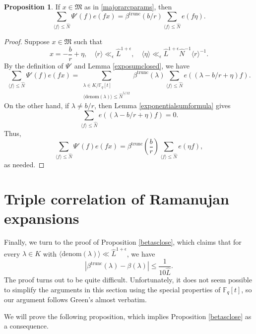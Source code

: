 \documentclass{article}
\theoremstyle{definition}
\newtheorem{prop}{Proposition}[section]
\theoremstyle{definition}
\theoremstyle{remark}
\newcommand{\F}{\mathbb{F}_q[t]}
\newcommand{\1}{\mathbf{1}}
\numberwithin{equation}{section}
\begin{document}
  \setcounter{prop}{2} %
  \begin{prop}\label{prop:5.3}
If $x\in \mathfrak{M}$ as in \eqref{majorarcparams}, then 
\[\sum_{\langle f\rangle \leq \widehat{N}} \Psi'(f)e(fx) =\beta^{\text{trunc}}(b\slash r)\sum_{\langle f\rangle \leq \widehat{N}} e(f\eta).\]
  \end{prop}



\begin{proof}
Suppose $x\in \mathfrak{M}$ such that 
\[x= -\frac{b}{r}+\eta, \quad\langle r \rangle \ll_{\epsilon} \widehat{L}^{1+\epsilon},\quad\langle \eta \rangle \ll_{\epsilon} \widehat{L}^{1+\epsilon}\widehat{N}^{-1}\langle r \rangle^{-1}.\]
By the definition of $\Psi'$ and Lemma \ref{exposumclosed}, we have
\[
\sum_{\langle f\rangle \leq \widehat{N}} \Psi'(f)e(fx)=\sum_{\substack{\lambda\in K\slash \F\\\langle \text{denom}(\lambda)\rangle\leq\widehat{N}^{5\slash 12}}}\beta^{\text{trunc}}(\lambda)\sum_{\langle f \rangle \leq \widehat{N}}e((\lambda-b\slash r+\eta)f).
\]
On the other hand, if $\lambda\neq b/r$, then Lemma \ref{exponentialsumformula} gives 
\[\sum_{\langle f \rangle \leq \widehat{N}}e((\lambda-b\slash r+\eta)f)=0.\]
Thus, 
\[\sum_{\langle f\rangle \leq \widehat{N}} \Psi'(f)e(fx)=\beta^{\text{trunc}}\left(\frac{b}{r}\right)\sum_{\langle f \rangle \leq \widehat{N}}e(\eta f),\]
as needed. 
\end{proof}
\endgroup

\setcounter{prop}{\value{saveprop}}

\section{Triple correlation of Ramanujan expansions}
Finally, we turn to the proof of Proposition \ref{betasclose}, which claims that for every $\lambda\in K$ with $\langle \text{denom}(\lambda)\rangle \ll \widehat{L}^{1+\epsilon}$, we have
\[|\beta^{\text{trunc}}(\lambda)-\beta(\lambda)|\leq \frac{1}{10\widehat{L}}.\]
The proof turns out to be quite difficult. Unfortunately, it does not seem possible to simplify the arguments in this section using the special properties of $\F$, so our argument follows Green's \cite{Green} almost verbatim. 

We will prove the following proposition, which implies Proposition \ref{betasclose} as a consequence. 
\end{document}
